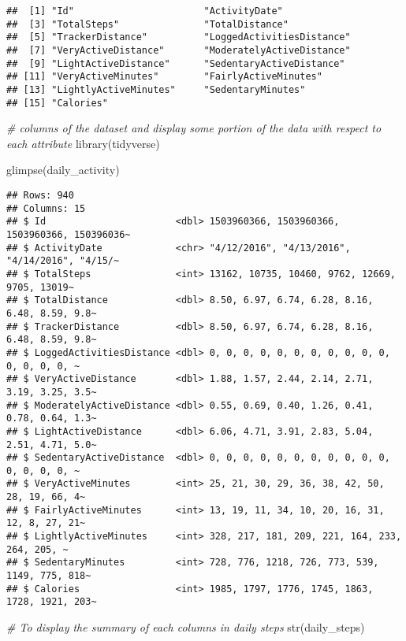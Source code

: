 \documentclass[
]{article}
\newenvironment{Shaded}{\begin{snugshade}}{\end{snugshade}}
\newcommand{\CommentTok}[1]{\textcolor[rgb]{0.56,0.35,0.01}{\textit{#1}}}
\newcommand{\FunctionTok}[1]{\textcolor[rgb]{0.00,0.00,0.00}{#1}}
\newcommand{\NormalTok}[1]{#1}
\begin{document}
\begin{verbatim}
##  [1] "Id"                       "ActivityDate"            
##  [3] "TotalSteps"               "TotalDistance"           
##  [5] "TrackerDistance"          "LoggedActivitiesDistance"
##  [7] "VeryActiveDistance"       "ModeratelyActiveDistance"
##  [9] "LightActiveDistance"      "SedentaryActiveDistance" 
## [11] "VeryActiveMinutes"        "FairlyActiveMinutes"     
## [13] "LightlyActiveMinutes"     "SedentaryMinutes"        
## [15] "Calories"
\end{verbatim}

\begin{Shaded}
\begin{Highlighting}[]
\CommentTok{\# columns of the dataset and display some portion of the data with respect to each attribute}
\FunctionTok{library}\NormalTok{(tidyverse)}

\FunctionTok{glimpse}\NormalTok{(daily\_activity)}
\end{Highlighting}
\end{Shaded}

\begin{verbatim}
## Rows: 940
## Columns: 15
## $ Id                       <dbl> 1503960366, 1503960366, 1503960366, 150396036~
## $ ActivityDate             <chr> "4/12/2016", "4/13/2016", "4/14/2016", "4/15/~
## $ TotalSteps               <int> 13162, 10735, 10460, 9762, 12669, 9705, 13019~
## $ TotalDistance            <dbl> 8.50, 6.97, 6.74, 6.28, 8.16, 6.48, 8.59, 9.8~
## $ TrackerDistance          <dbl> 8.50, 6.97, 6.74, 6.28, 8.16, 6.48, 8.59, 9.8~
## $ LoggedActivitiesDistance <dbl> 0, 0, 0, 0, 0, 0, 0, 0, 0, 0, 0, 0, 0, 0, 0, ~
## $ VeryActiveDistance       <dbl> 1.88, 1.57, 2.44, 2.14, 2.71, 3.19, 3.25, 3.5~
## $ ModeratelyActiveDistance <dbl> 0.55, 0.69, 0.40, 1.26, 0.41, 0.78, 0.64, 1.3~
## $ LightActiveDistance      <dbl> 6.06, 4.71, 3.91, 2.83, 5.04, 2.51, 4.71, 5.0~
## $ SedentaryActiveDistance  <dbl> 0, 0, 0, 0, 0, 0, 0, 0, 0, 0, 0, 0, 0, 0, 0, ~
## $ VeryActiveMinutes        <int> 25, 21, 30, 29, 36, 38, 42, 50, 28, 19, 66, 4~
## $ FairlyActiveMinutes      <int> 13, 19, 11, 34, 10, 20, 16, 31, 12, 8, 27, 21~
## $ LightlyActiveMinutes     <int> 328, 217, 181, 209, 221, 164, 233, 264, 205, ~
## $ SedentaryMinutes         <int> 728, 776, 1218, 726, 773, 539, 1149, 775, 818~
## $ Calories                 <int> 1985, 1797, 1776, 1745, 1863, 1728, 1921, 203~
\end{verbatim}

\begin{Shaded}
\begin{Highlighting}[]
\CommentTok{\# To display the summary of each columns in daily steps}
\FunctionTok{str}\NormalTok{(daily\_steps)}
\end{Highlighting}
\end{Shaded}
\end{document}
